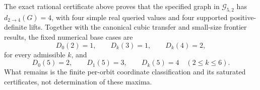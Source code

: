 The exact rational certificate above proves that the specified graph in \(\mathcal G_{5,2}\) has \(d_{2\to4}(G)=4\), with four simple real queried values and four supported positive-definite lifts. Together with the canonical cubic transfer and small-size frontier results, the fixed numerical base cases are
\[
D_0(2)=1,\qquad D_k(3)=1,\qquad D_k(4)=2,
\]
for every admissible \(k\), and
\[
D_0(5)=2,\qquad D_1(5)=3,\qquad D_k(5)=4\quad(2\le k\le6).
\]
What remains is the finite per-orbit coordinate classification and its saturated certificates, not determination of these maxima.
